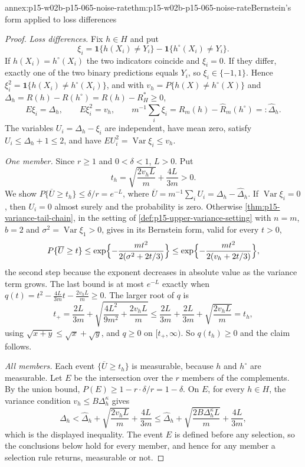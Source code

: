 \begin{annexitem}{annex:p15-w02b-p15-065-noise-rate}{thm:p15-w02b-p15-065-noise-rate}{Bernstein's form applied to loss differences}
\begin{proof}
\emph{Loss differences.} Fix \(h\in H\) and put
\[
 \xi_i=\mathbf1\{h(X_i)\ne Y_i\}-\mathbf1\{h^{\circ}(X_i)\ne Y_i\}.
\]
If \(h(X_i)=h^{\circ}(X_i)\) the two indicators coincide and
\(\xi_i=0\). If they differ, exactly one of the two binary predictions
equals \(Y_i\), so \(\xi_i\in\{-1,1\}\). Hence
\(\xi_i^2=\mathbf1\{h(X_i)\ne h^{\circ}(X_i)\}\), and with
\(v_h=P\{h(X)\ne h^{\circ}(X)\}\) and
\(\Delta_h=R(h)-R(h^{\circ})=R(h)-R_H^{*}\geq0\),
\[
 E\xi_i=\Delta_h,\qquad E\xi_i^2=v_h,\qquad
 m^{-1}\textstyle\sum_i\xi_i=\widehat R_m(h)-\widehat R_m(h^{\circ})
 =:\widehat\Delta_h .
\]
The variables \(U_i=\Delta_h-\xi_i\) are independent, have mean zero,
satisfy \(U_i\leq\Delta_h+1\leq2\), and have
\(EU_i^2=\operatorname{Var}\xi_i\leq v_h\).

\emph{One member.} Since \(r\geq1\) and \(0<\delta<1\), \(L>0\). Put
\[
 t_h=\sqrt{\frac{2v_hL}m}+\frac{4L}{3m}>0 .
\]
We show \(P\{\overline U\geq t_h\}\leq\delta/r=e^{-L}\), where
\(\overline U=m^{-1}\sum_iU_i=\Delta_h-\widehat\Delta_h\). If
\(\operatorname{Var}\xi_i=0\), then \(U_i=0\) almost surely and the
probability is zero. Otherwise \cref{thm:p15-variance-tail-chain}, in the
setting of \cref{def:p15-upper-variance-setting} with \(n=m\), \(b=2\) and
\(\sigma^2=\operatorname{Var}\xi_1>0\), gives in its Bernstein form, valid
for every \(t>0\),
\[
 P\{\overline U\geq t\}\leq\exp\Bigl\{-\frac{mt^2}{2(\sigma^2+2t/3)}\Bigr\}
 \leq\exp\Bigl\{-\frac{mt^2}{2(v_h+2t/3)}\Bigr\},
\]
the second step because the exponent decreases in absolute value as the
variance term grows. The last bound is at most \(e^{-L}\) exactly when
\(q(t)=t^2-\frac{4L}{3m}t-\frac{2v_hL}m\geq0\). The larger root of \(q\) is
\[
 t_+=\frac{2L}{3m}+\sqrt{\frac{4L^2}{9m^2}+\frac{2v_hL}m}
 \leq\frac{2L}{3m}+\frac{2L}{3m}+\sqrt{\frac{2v_hL}m}=t_h,
\]
using \(\sqrt{x+y}\leq\sqrt x+\sqrt y\), and \(q\geq0\) on
\([t_+,\infty)\). So \(q(t_h)\geq0\) and the claim follows.

\emph{All members.} Each event \(\{\overline U\geq t_h\}\) is measurable,
because \(h\) and \(h^{\circ}\) are measurable. Let \(E\) be the
intersection over the \(r\) members of the complements. By the union
bound, \(P(E)\geq1-r\cdot\delta/r=1-\delta\). On \(E\), for every
\(h\in H\), the variance condition \(v_h\leq B\Delta_h^{\kappa}\) gives
\[
 \Delta_h<\widehat\Delta_h+\sqrt{\frac{2v_hL}m}+\frac{4L}{3m}
 \leq\widehat\Delta_h+\sqrt{\frac{2B\Delta_h^{\kappa}L}m}+\frac{4L}{3m},
\]
which is the displayed inequality. The event \(E\) is defined before any
selection, so the conclusions below hold for every member, and hence for
any member a selection rule returns, measurable or not.


\end{proof}
\end{annexitem}
